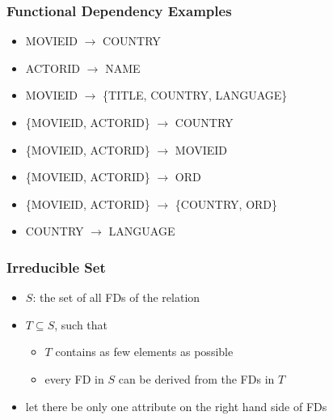 \documentclass[dvipsnames]{beamer}
\begin{document}
\begin{frame}
  \frametitle{Functional Dependency Examples}

  \begin{example}
    \begin{itemize}
      \item MOVIEID $\rightarrow$ COUNTRY

      \pause
      \item ACTORID $\rightarrow$ NAME

      \pause
      \item MOVIEID $\rightarrow$ \{TITLE, COUNTRY, LANGUAGE\}

      \pause
      \item \{MOVIEID, ACTORID\} $\rightarrow$ COUNTRY

      \pause
      \item \{MOVIEID, ACTORID\} $\rightarrow$ MOVIEID

      \pause
      \item \{MOVIEID, ACTORID\} $\rightarrow$ ORD

      \pause
      \item \{MOVIEID, ACTORID\} $\rightarrow$ \{COUNTRY, ORD\}

      \pause
      \item COUNTRY $\rightarrow$ LANGUAGE
    \end{itemize}
  \end{example}
\end{frame}

\begin{frame}
  \frametitle{Irreducible Set}

  \begin{itemize}
    \item $S$: the set of all FDs of the relation

    \item $T \subseteq S$, such that
    \begin{itemize}
      \item $T$ contains as few elements as possible
      \item every FD in $S$ can be derived from the FDs in $T$
    \end{itemize}

    \pause
    \medskip
    \item let there be only one attribute on the right hand side of FDs
  \end{itemize}
\end{frame}
\end{document}
